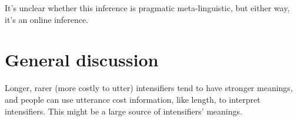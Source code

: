 \documentclass[a4paper,10pt]{article}
\newcommand{\todo}[1]{{\color{red}#1}}
\begin{document}
      \todo{It's unclear whether this inference is pragmatic meta-linguistic, but either way, it's an online inference.}
  
\section{General discussion}
  \todo{Longer, rarer (more costly to utter) intensifiers tend to have stronger meanings, and people can use utterance cost information, like length, to interpret intensifiers. This might be a large source of intensifiers' meanings.}




\end{document}
